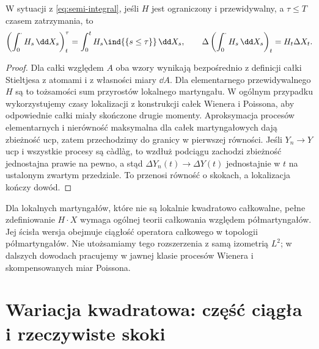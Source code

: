 \begin{lemat}
\label{lem:semi-jumps}
W sytuacji z \eqref{eq:semi-integral}, jeśli $H$ jest
ograniczony i przewidywalny, a $\tau\le T$ czasem zatrzymania,
to
\[
\left(\int_0^\cdot H_s\,\dd X_s\right)^\tau_t
=\int_0^tH_s\ind{\{s\le\tau\}}\,\dd X_s,
\qquad
\Delta\left(\int_0^\cdot H_s\,\dd X_s\right)_t
=H_t\Delta X_t.
\]
\end{lemat}
\begin{proof}
Dla całki względem $A$ oba wzory wynikają bezpośrednio
z definicji całki Stieltjesa z atomami i z własności
miary $\dd A$. Dla elementarnego przewidywalnego $H$
są to tożsamości sum przyrostów lokalnego martyngału.
W ogólnym przypadku wykorzystujemy czasy lokalizacji z konstrukcji
całek Wienera i Poissona, aby odpowiednie całki miały skończone
drugie momenty. Aproksymacja
procesów elementarnych i nierówność maksymalna dla
całek martyngałowych dają zbieżność ucp, zatem
przechodzimy do granicy w pierwszej równości.
Jeśli $Y_n\to Y$ ucp i wszystkie procesy są càdlàg,
to wzdłuż podciągu zachodzi zbieżność jednostajna
prawie na pewno, a stąd $\Delta Y_n(t)\to\Delta Y(t)$
jednostajnie w $t$ na ustalonym zwartym przedziale.
To przenosi równość o skokach, a lokalizacja kończy dowód.
\end{proof}

\begin{uwaga}
Dla lokalnych martyngałów, które nie są lokalnie
kwadratowo całkowalne, pełne zdefiniowanie
$H\cdot X$ wymaga ogólnej teorii całkowania względem
półmartyngałów. Jej ścisła wersja obejmuje ciągłość
operatora całkowego w topologii półmartyngałów.
Nie utożsamiamy tego rozszerzenia z samą izometrią $L^2$;
w dalszych dowodach pracujemy w jawnej klasie
procesów Wienera i skompensowanych miar Poissona.
\end{uwaga}

\section{Wariacja kwadratowa: część ciągła i rzeczywiste skoki}

